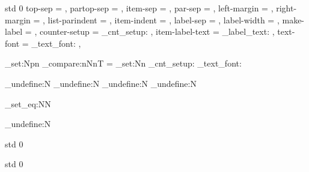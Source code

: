  {std} {0}
  {
    top-sep          = \topsep      ,
    partop-sep       = \partopsep   ,
    item-sep         = \itemsep     ,
    par-sep          = \parsep      ,
    left-margin      = \leftmargin  ,
    right-margin     = \rightmargin ,
    list-parindent   = \listparindent ,
    item-indent      = \itemindent  ,
    label-sep        =     ,
    label-width      =   ,
    make-label       = \makelabel   ,
    counter-setup    = \list_cnt_setup: ,
    item-label-text  = \list_label_text:   ,
    text-font        = \list_text_font:  ,             %
  }
  {

   \cs_set:Npn \MaybeExecuteEndCode {\endlist}
        {
         \AssignTemplateKeys
         \dim_compare:nNnT  = \maxdimen
           { \dim_set:Nn  }
         \list_cnt_setup:
         \list_text_font:
         }
  }


\cs_undefine:N \itemize
\cs_undefine:N \enumerate
\cs_undefine:N \enditemize
\cs_undefine:N \endenumerate

\cs_set_eq:NN \origitem \item
\cs_undefine:N \item


 {std} {0}
  {}

 {std} {0}
  {}
  {
   \AssignTemplateKeys
   \origitem
  }

\ExplSyntaxOff

